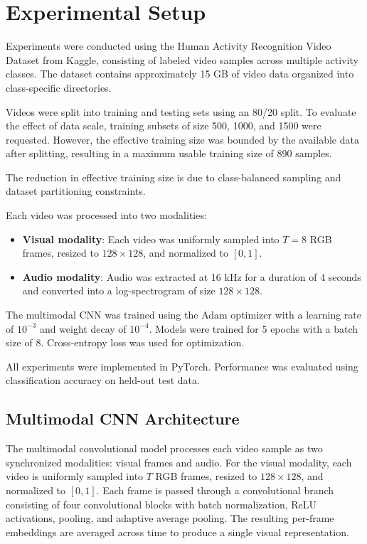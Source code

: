 \documentclass{article}
\begin{document}
	\section{Experimental Setup}

Experiments were conducted using the Human Activity Recognition Video Dataset from Kaggle, consisting of labeled video samples across multiple activity classes. The dataset contains approximately 15 GB of video data organized into class-specific directories.

Videos were split into training and testing sets using an 80/20 split. To evaluate the effect of data scale, training subsets of size 500, 1000, and 1500 were requested. However, the effective training size was bounded by the available data after splitting, resulting in a maximum usable training size of 890 samples.

The reduction in effective training size is due to class-balanced sampling and dataset partitioning constraints.

Each video was processed into two modalities:

\begin{itemize}
	\item \textbf{Visual modality}: Each video was uniformly sampled into $T = 8$ RGB frames, resized to $128 \times 128$, and normalized to $[0,1]$.
	\item \textbf{Audio modality}: Audio was extracted at 16 kHz for a duration of 4 seconds and converted into a log-spectrogram of size $128 \times 128$.
\end{itemize}

The multimodal CNN was trained using the Adam optimizer with a learning rate of $10^{-3}$ and weight decay of $10^{-4}$. Models were trained for 5 epochs with a batch size of 8. Cross-entropy loss was used for optimization.

All experiments were implemented in PyTorch. Performance was evaluated using classification accuracy on held-out test data.

	\subsection{Multimodal CNN Architecture}

The multimodal convolutional model processes each video sample as two synchronized modalities: visual frames and audio. For the visual modality, each video is uniformly sampled into $T$ RGB frames, resized to $128 \times 128$, and normalized to $[0,1]$. Each frame is passed through a convolutional branch consisting of four convolutional blocks with batch normalization, ReLU activations, pooling, and adaptive average pooling. The resulting per-frame embeddings are averaged across time to produce a single visual representation.
\end{document}
